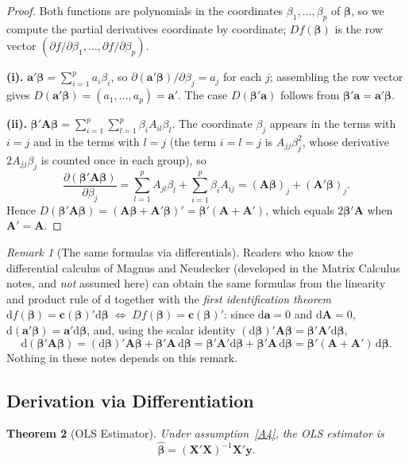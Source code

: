 \documentclass[14pt]{extarticle}
\theoremstyle{plain}
\newtheorem{theorem}{Theorem}[section]
\theoremstyle{definition}
\theoremstyle{remark}
\newtheorem{remark}[theorem]{Remark}
\newcommand{\ifff}{\;\Longleftrightarrow\;}
\newcommand{\bX}{\mathbf{X}}
\newcommand{\by}{\mathbf{y}}
\def\bb{\boldsymbol{\beta}}
\def\bc{\mathbf{c}}
\newcommand{\bA}{\mathbf{A}}
\newcommand{\ba}{\mathbf{a}}
\newcommand{\dd}{\mathrm{d}}
\begin{document}
\begin{proof}
Both functions are polynomials in the coordinates $\beta_1, \ldots, \beta_p$ of $\bb$, so we compute the partial derivatives coordinate by coordinate; $Df(\bb)$ is the row vector $(\partial f/\partial\beta_1, \ldots, \partial f/\partial\beta_p)$.

\textbf{(i).} $\ba'\bb = \sum_{i=1}^p a_i\beta_i$, so $\partial(\ba'\bb)/\partial\beta_j = a_j$ for each $j$; assembling the row vector gives $D(\ba'\bb) = (a_1, \ldots, a_p) = \ba'$. The case $D(\bb'\ba)$ follows from $\bb'\ba = \ba'\bb$.

\textbf{(ii).} $\bb'\bA\bb = \sum_{i=1}^p\sum_{l=1}^p \beta_i A_{il}\beta_l$. The coordinate $\beta_j$ appears in the terms with $i = j$ and in the terms with $l = j$ (the term $i = l = j$ is $A_{jj}\beta_j^2$, whose derivative $2A_{jj}\beta_j$ is counted once in each group), so
\[
\frac{\partial(\bb'\bA\bb)}{\partial\beta_j} = \sum_{l=1}^p A_{jl}\beta_l + \sum_{i=1}^p \beta_i A_{ij} = (\bA\bb)_j + (\bA'\bb)_j.
\]
Hence $D(\bb'\bA\bb) = (\bA\bb + \bA'\bb)' = \bb'(\bA + \bA')$, which equals $2\bb'\bA$ when $\bA' = \bA$.
\end{proof}

\begin{remark}[The same formulas via differentials]\label{rem:differentials}
Readers who know the differential calculus of Magnus and Neudecker (developed in the Matrix Calculus notes, and \emph{not} assumed here) can obtain the same formulas from the linearity and product rule of $\dd$ together with the \emph{first identification theorem} $\dd f(\bb) = \bc(\bb)'\dd\bb \ifff Df(\bb) = \bc(\bb)'$: since $\dd\ba = 0$ and $\dd\bA = 0$, $\dd(\ba'\bb) = \ba'\dd\bb$, and, using the scalar identity $(\dd\bb)'\bA\bb = \bb'\bA'\dd\bb$,
\[
\dd(\bb'\bA\bb) = (\dd\bb)'\bA\bb + \bb'\bA\,\dd\bb = \bb'\bA'\dd\bb + \bb'\bA\,\dd\bb = \bb'(\bA+\bA')\,\dd\bb.
\]
Nothing in these notes depends on this remark.
\end{remark}

\subsection{Derivation via Differentiation}

\begin{theorem}[OLS Estimator]\label{thm:ols}
Under assumption~\ref{A4}, the OLS estimator is
\begin{equation}
\boxed{\hat{\bb} = (\bX'\bX)^{-1}\bX'\by.}
\end{equation}
\end{theorem}
\end{document}
